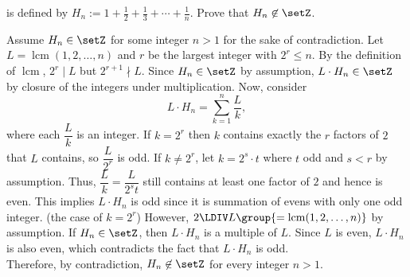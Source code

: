 \begin{enumerate}
is defined by $H_n:=1+\tfrac{1}{2}+\tfrac{1}{3}+\cdots+\tfrac{1}{n}$.
Prove that $H_n \not \in \setZ$.
\begin{subprove}
  Assume $H_n \in \setZ$ for some integer $n>1$ for the sake of contradiction.
  Let $L = \operatorname{lcm}(1,2,\dots,n)$ and 
  $r$ be the largest integer with $2^r\le n$. By the definition of $\operatorname{lcm}$,
  $2^r\mid L$ but $2^{r+1}\nmid L$.
  Since $H_n\in\setZ$ by assumption, $L\cdot H_n\in\setZ$ by closure of the integers under multiplication.
  Now, consider
  \[
    L\cdot H_n = \sum_{k=1}^n \frac{L}{k},
  \]
  where each $\dfrac{L}{k}$ is an integer. If $k=2^r$ then $k$ contains exactly the $r$ factors of 
  $2$ that $L$ contains, so $\dfrac{L}{2^r}$ is odd. If $k\neq 2^r$, let $k=2^s\cdot t$ where $t$ 
  odd and $s<r$ by assumption. Thus, $\dfrac{L}{k}=\dfrac{L}{2^s t}$ still contains at least one 
  factor of $2$ and hence is even. This implies $L\cdot H_n$ is odd since it is summation of evens
  with only one odd integer. (the case of $k=2^r$)
  However, $2\LDIV L \group{= \operatorname{lcm}(1,2,\dots,n)}$ by assumption. 
  If $H_n\in\setZ$, then $L\cdot H_n$ is a multiple of $L$. 
  Since $L$ is even, $L\cdot H_n$ is also even, which contradicts the fact that $L\cdot H_n$ is odd.\vspace*{10px}\\
  Therefore, by contradiction, $H_n\not\in\setZ$ for every integer $n>1$.
\end{subprove}






\end{enumerate}
